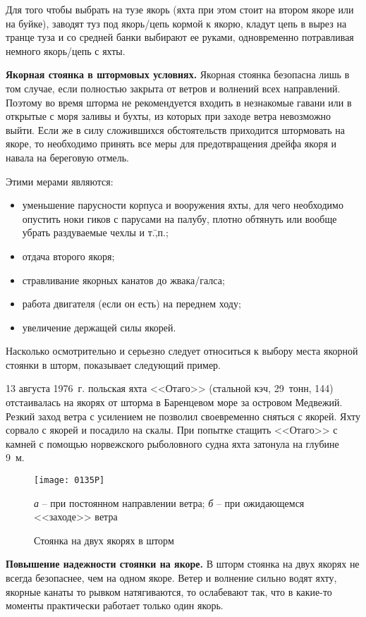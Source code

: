 Для того чтобы выбрать на тузе якорь (яхта при этом стоит на втором якоре или на буйке), заводят туз под якорь\-/цепь кормой к якорю, кладут цепь в вырез на транце туза и со средней банки выбирают ее руками, одновременно потравливая немного якорь\-/цепь с яхты.

\textbf{Якорная стоянка в штормовых условиях.} Якорная стоянка безопасна лишь в том случае, если полностью закрыта от ветров и волнений всех направлений. Поэтому во время шторма не рекомендуется входить в незнакомые гавани или в открытые с моря заливы и бухты, из которых при заходе ветра невозможно выйти. Если же в силу сложившихся обстоятельств приходится штормовать на якоре, то необходимо принять все меры для предотвращения дрейфа якоря и навала на береговую отмель. 

Этими мерами являются: 
\begin{itemize}
\item уменьшение парусности корпуса и вооружения яхты, для чего необходимо опустить ноки гиков с парусами на палубу, плотно обтянуть или вообще убрать раздуваемые чехлы и т.\=,п.; 
\item отдача второго якоря; 
\item стравливание якорных канатов до жвака\-/галса; 
\item работа двигателя (если он есть) на переднем ходу; 
\item увеличение держащей силы якорей. 
\end{itemize}

Насколько осмотрительно и серьезно следует относиться к выбору места якорной стоянки в шторм, показывает следующий пример.

{\small 13 августа 1976~г. польская яхта <<Отаго>> (стальной кэч, 29~тонн, 144\msq) отстаивалась на якорях от шторма в Баренцевом море за островом Медвежий. Резкий заход ветра с усилением не позволил своевременно сняться с якорей. Яхту сорвало с якорей и посадило на скалы. При попытке стащить <<Отаго>> с камней с помощью норвежского рыболовного судна яхта затонула на глубине 9~м.}

\begin{figure*}[htb]
  \centering{}
  \texttt{[image: 0135P]}
  \caption{Стоянка на двух якорях в шторм}
  \label{fig:135}
  \small
  \centering{}
  \textit{а} \--- при постоянном направлении ветра; \textit{б} \--- при ожидающемся <<заходе>> ветра
\end{figure*}

\textbf{Повышение надежности стоянки на якоре.} В шторм стоянка на двух якорях не всегда безопаснее, чем на одном якоре. Ветер и волнение сильно водят яхту, якорные канаты то рывком натягиваются, то ослабевают так, что в какие-то моменты практически работает только один якорь.

